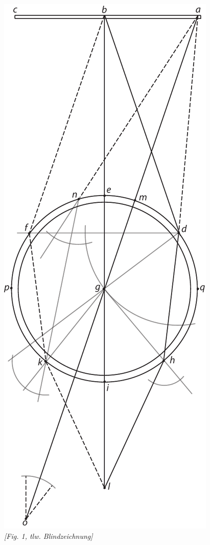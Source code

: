      \begin{center}
     \includegraphics[width=0.37\textheight]{images/37_2_1r}\\
     \hspace{1mm} \textit{[Fig. 1, tlw. Blindzeichnung]}
     \end{center}
